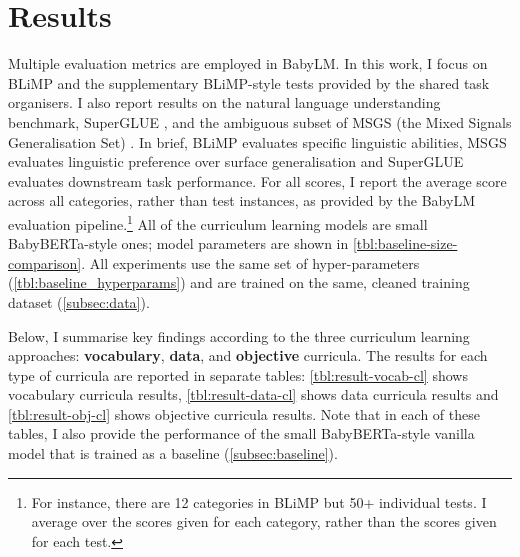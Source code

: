 
\section{Results}
\label{sec:climb-results}

Multiple evaluation metrics are employed in BabyLM. In this work, I focus on BLiMP \citep{warstadt2020blimp} and the supplementary BLiMP-style tests provided by the shared task organisers. I also report results on the natural language understanding benchmark, SuperGLUE \citep{wang2019superglue}, and the ambiguous subset of MSGS (the Mixed Signals Generalisation Set) \citep{warstadt2020msgs}. In brief, BLiMP evaluates specific linguistic abilities, MSGS evaluates linguistic preference over surface generalisation and SuperGLUE evaluates downstream task performance. For all scores, I report the average score across all categories, rather than test instances, as provided by the BabyLM evaluation pipeline.\footnote{For instance, there are 12 categories in BLiMP but 50+ individual tests. I average over the scores given for each category, rather than the scores given for each test.} All of the curriculum learning models are small BabyBERTa-style ones; model parameters are shown in \cref{tbl:baseline-size-comparison}. All experiments use the same set of hyper-parameters (\cref{tbl:baseline_hyperparams}) and are trained on the same, cleaned training dataset (\cref{subsec:data}). 

Below, I summarise key findings according to the three curriculum learning approaches: \textbf{vocabulary}, \textbf{data}, and \textbf{objective} curricula. The results for each type of curricula are reported in separate tables: \cref{tbl:result-vocab-cl} shows vocabulary curricula results, \cref{tbl:result-data-cl} shows data curricula results and \cref{tbl:result-obj-cl} shows objective curricula results. Note that in each of these tables, I also provide the performance of the small BabyBERTa-style vanilla model that is trained as a baseline (\cref{subsec:baseline}). 

